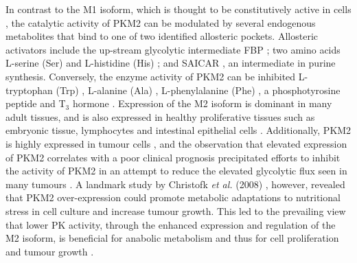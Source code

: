 In contrast to the M1 isoform, which is thought to be constitutively active in cells \cite{Anastasiou:2012aa}, the catalytic activity of PKM2 can be modulated by several endogenous metabolites that bind to one of two identified allosteric pockets. Allosteric activators include the up-stream glycolytic intermediate FBP \cite{Sparmann:1973aa}; two amino acids L-serine (Ser) \cite{Chaneton:2012aa} and L-histidine (His) \cite{Yuan:2018aa}; and SAICAR \cite{Keller:2012aa}, an intermediate in purine synthesis. Conversely, the enzyme activity of PKM2 can be inhibited L-tryptophan (Trp) \cite{Yuan:2018aa}, L-alanine (Ala) \cite{Yuan:2018aa}, L-phenylalanine (Phe) \cite{Morgan:2013aa}, a phosphotyrosine peptide \cite{Christofk:2008aa} and T$_{3}$ hormone \cite{Kato:1989aa}. Expression of the M2 isoform is dominant in many adult tissues, and is also expressed in healthy proliferative tissues such as embryonic tissue, lymphocytes and intestinal epithelial cells \cite{Dayton:2016ab}. Additionally, PKM2 is highly expressed in tumour cells \cite{Christofk:2008ab}, and the observation that elevated expression of PKM2 correlates with a poor clinical prognosis \cite{Luftner:2000aa,Lu:2016ac} precipitated efforts to inhibit the activity of PKM2 in an attempt to reduce the elevated glycolytic flux seen in many tumours \cite{Chen:2011aa,Vander-Heiden:2010aa}. A landmark study by Christofk \textit{et al.} (2008) \cite{Christofk:2008ab}, however, revealed that PKM2 over-expression could promote metabolic adaptations to nutritional stress in cell culture and increase tumour growth. This led to the prevailing view that lower PK activity, through the enhanced expression and regulation of the M2 isoform, is beneficial for anabolic metabolism and thus for cell proliferation and tumour growth \cite{Vander-Heiden:2011aa,Vander-Heiden:2009aa,Mazurek:2011aa,Israelsen:2015aa,Dayton:2016ab,Jiang:2012aa}.
%
%
%
